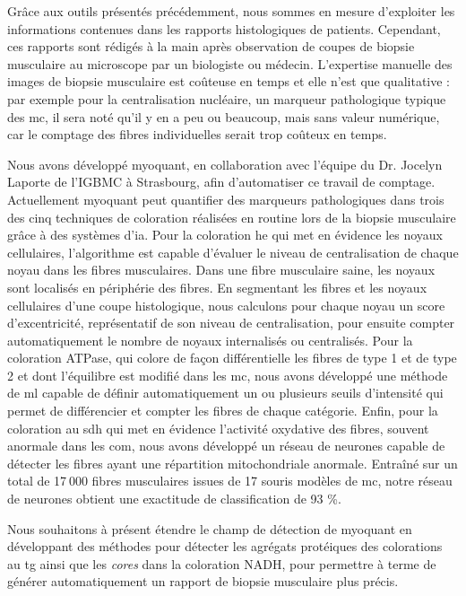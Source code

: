 Grâce aux outils présentés précédemment, nous sommes en mesure d’exploiter les informations contenues dans les rapports histologiques de patients. Cependant, ces rapports sont rédigés à la main après observation de coupes de biopsie musculaire au microscope par un biologiste ou médecin. L’expertise manuelle des images de biopsie musculaire est coûteuse en temps et elle n’est que qualitative : par exemple pour la centralisation nucléaire, un marqueur pathologique typique des \gls{mc}, il sera noté qu’il y en a peu ou beaucoup, mais sans valeur numérique, car le comptage des fibres individuelles serait trop coûteux en temps. 

Nous avons développé \gls{myoquant}, en collaboration avec l’équipe du Dr. Jocelyn Laporte de l’IGBMC à Strasbourg, afin d’automatiser ce travail de comptage. Actuellement \gls{myoquant} peut quantifier des marqueurs pathologiques dans trois des cinq techniques de coloration réalisées en routine lors de la biopsie musculaire grâce à des systèmes d’\gls{ia}. Pour la coloration \gls{he} qui met en évidence les noyaux cellulaires, l’algorithme est capable d’évaluer le niveau de centralisation de chaque noyau dans les fibres musculaires. Dans une fibre musculaire saine, les noyaux sont localisés en périphérie des fibres. En segmentant les fibres et les noyaux cellulaires d’une coupe histologique, nous calculons pour chaque noyau un score d’excentricité, représentatif de son niveau de centralisation, pour ensuite compter automatiquement le nombre de noyaux internalisés ou centralisés. Pour la coloration ATPase, qui colore de façon différentielle les fibres de type 1 et de type 2 et dont l'équilibre est modifié dans les \gls{mc}, nous avons développé une méthode de \gls{ml} capable de définir automatiquement un ou plusieurs seuils d’intensité qui permet de différencier et compter les fibres de chaque catégorie. Enfin, pour la coloration au \gls{sdh} qui met en évidence l’activité oxydative des fibres, souvent anormale dans les \gls{com}, nous avons développé un réseau de neurones capable de détecter les fibres ayant une répartition mitochondriale anormale. Entraîné sur un total de 17 000 fibres musculaires issues de 17 souris modèles de \gls{mc}, notre réseau de neurones obtient une exactitude de classification de 93 \%.

Nous souhaitons à présent étendre le champ de détection de \gls{myoquant} en développant des méthodes pour détecter les agrégats protéiques des colorations au \gls{tg} ainsi que les \textit{cores} dans la coloration NADH, pour permettre à terme de générer automatiquement un rapport de biopsie musculaire plus précis. 

